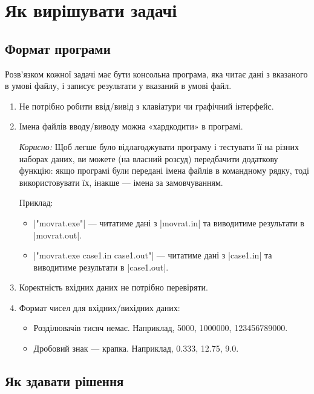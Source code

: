 \documentclass[12pt,a4paper]{article}
\begin{document}
\section*{Як вирішувати задачі}


\subsection*{Формат програми}

Розв'язком кожної задачі має бути консольна програма, яка читає дані з вказаного в умові файлу, і записує результати у вказаний в умові файл.

\begin{enumerate}
    \item Не потрібно робити ввід/вивід з клавіатури чи графічний інтерфейс.
    \item Імена файлів вводу/виводу можна «хардкодити» в програмі.

        \vspace{0.5em}
        \emph{Корисно:} Щоб легше було відлагоджувати програму і тестувати її на різних наборах даних, ви можете (на власний розсуд) передбачити додаткову функцію: якщо програмі були передані імена файлів в командному рядку, тоді використовувати їх, інакше --- імена за замовчуванням.

        \vspace{0.5em}
        Приклад:
        \begin{itemize}
            \item |"movrat.exe"| --- читатиме дані з |movrat.in| та виводитиме результати в |movrat.out|.
            \item |"movrat.exe case1.in case1.out"| --- читатиме дані з |case1.in| та виводитиме результати в |case1.out|.
        \end{itemize}

    \item Коректність вхідних даних не потрібно перевіряти.
    \item Формат чисел для вхідних/вихідних даних:
        \begin{itemize}
            \item Розділювачів тисяч немає. Наприклад, 5000, 1000000, 123456789000.
            \item Дробовий знак --- крапка. Наприклад, 0.333, 12.75, 9.0.
        \end{itemize}
\end{enumerate}


\subsection*{Як здавати рішення}
\end{document}
